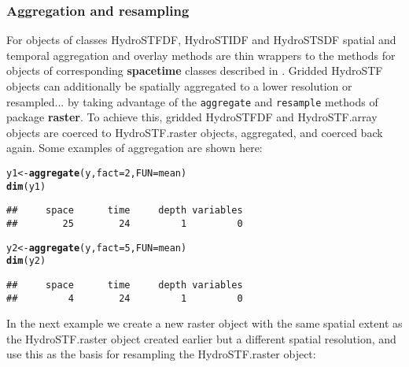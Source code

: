 \documentclass{icldt}\usepackage[]{graphicx}\usepackage[]{color}
\makeatletter
\newcommand{\hlnum}[1]{\textcolor[rgb]{0.686,0.059,0.569}{#1}}%
\newcommand{\hlstd}[1]{\textcolor[rgb]{0.345,0.345,0.345}{#1}}%
\newcommand{\hlkwb}[1]{\textcolor[rgb]{0.69,0.353,0.396}{#1}}%
\newcommand{\hlkwc}[1]{\textcolor[rgb]{0.333,0.667,0.333}{#1}}%
\newcommand{\hlkwd}[1]{\textcolor[rgb]{0.737,0.353,0.396}{\textbf{#1}}}%
\newenvironment{kframe}{%
 \def\at@end@of@kframe{}%
 \ifinner\ifhmode%
  \def\at@end@of@kframe{\end{minipage}}%
  \begin{minipage}{\columnwidth}%
 \fi\fi%
 \def\FrameCommand##1{\hskip\@totalleftmargin \hskip-\fboxsep
 \colorbox{shadecolor}{##1}\hskip-\fboxsep
     \hskip-\linewidth \hskip-\@totalleftmargin \hskip\columnwidth}%
 \MakeFramed {\advance\hsize-\width
   \@totalleftmargin\z@ \linewidth\hsize
   \@setminipage}}%
 {\par\unskip\endMakeFramed%
 \at@end@of@kframe}
\newenvironment{knitrout}{}{} %
\makeatother
\begin{document}
\subsubsection{Aggregation and resampling}
For objects of classes HydroSTFDF, HydroSTIDF and HydroSTSDF spatial and temporal aggregation and overlay methods are thin wrappers to the methods for objects of corresponding \textbf{spacetime} classes described in \citet{pebesma2012}. Gridded HydroSTF objects can additionally be spatially aggregated to a lower resolution or resampled... by taking advantage of the \texttt{aggregate} and \texttt{resample} methods of package \textbf{raster}. To achieve this, gridded HydroSTFDF and HydroSTF.array objects are coerced to HydroSTF.raster objects, aggregated, and coerced back again. Some examples of aggregation are shown here: \\

\begin{knitrout}
\color{fgcolor}\begin{kframe}
\begin{alltt}
\hlstd{y1} \hlkwb{<-} \hlkwd{aggregate}\hlstd{(y,} \hlkwc{fact}\hlstd{=}\hlnum{2}\hlstd{,} \hlkwc{FUN}\hlstd{=mean)}
\hlkwd{dim}\hlstd{(y1)}
\end{alltt}
\begin{verbatim}
##     space      time     depth variables 
##        25        24         1         0
\end{verbatim}
\begin{alltt}
\hlstd{y2} \hlkwb{<-} \hlkwd{aggregate}\hlstd{(y,} \hlkwc{fact}\hlstd{=}\hlnum{5}\hlstd{,} \hlkwc{FUN}\hlstd{=mean)}
\hlkwd{dim}\hlstd{(y2)}
\end{alltt}
\begin{verbatim}
##     space      time     depth variables 
##         4        24         1         0
\end{verbatim}
\end{kframe}
\end{knitrout}

\noindent In the next example we create a new raster object with the same spatial extent as the HydroSTF.raster object created earlier but a different spatial resolution, and use this as the basis for resampling the HydroSTF.raster object:
\end{document}
